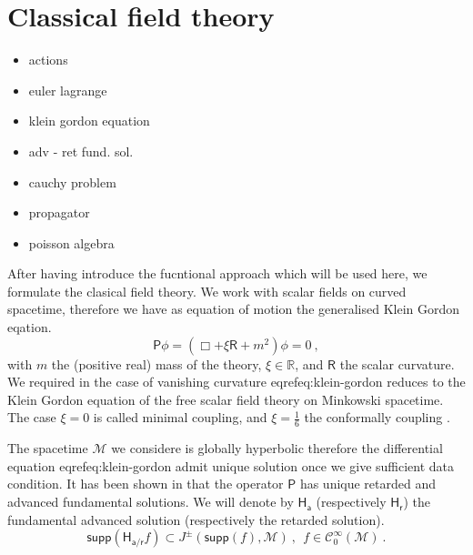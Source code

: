 \documentclass[10pt]{book}
\newcommand{\supp}{\mathsf{supp}}
\newcommand{\Ccal}{\mathcal{C}}
\newcommand{\Mcal}{\mathcal{M}}
\newcommand{\Rbb}{\mathbb{R}}
\newcommand{\Hsf}{\mathsf{H}}
\newcommand{\Psf}{\mathsf{P}}
\newcommand{\Rsf}{\mathsf{R}}
\newcommand{\asf}{\mathsf{a}}
\newcommand{\rsf}{\mathsf{r}}
\theoremstyle{break}
\begin{document}
\section{Classical field theory}

\begin{itemize}
\item actions
\item euler lagrange
\item klein gordon equation
\item adv - ret fund. sol.
\item cauchy problem
\item propagator
\item poisson algebra
\end{itemize}

\vspace*{88pt}


After having introduce the fucntional approach which will be used here, we formulate the clasical field theory. We work with scalar fields on curved spacetime, therefore we have as equation of motion the generalised Klein Gordon eqation.%
%
\begin{equation}
\Psf \phi = \left( \Box + \xi \Rsf + m^2 \right) \phi = 0 \ , 
\end{equation}
%
with $m$ the (positive real) mass of the theory, $\xi \in \Rbb$, and $\Rsf$ the scalar curvature. We required in the case of vanishing curvature eqref{eq:klein-gordon} reduces to the Klein Gordon equation of the free scalar field theory on Minkowski spacetime. The case $\xi=0$ is called minimal coupling, and $\xi=\frac16$ the conformally coupling %
.\par%


\bigskip


The spacetime $\Mcal$ we considere is globally hyperbolic therefore the differential equation eqref{eq:klein-gordon} admit unique solution once we give sufficient data condition. It has been shown in %
that the operator $\Psf$ has unique retarded and advanced fundamental solutions. We will denote by $\Hsf_\asf$ (respectively $\Hsf_\rsf$) the fundamental advanced solution (respectively the retarded solution). 
%
\begin{equation*}
\supp\left( \Hsf_{\asf/\rsf} f \right) \subset J^{\pm}\left(\supp\left(f\right),\Mcal\right) \ , \ \ f \in \Ccal^\infty_0(\Mcal) \ . 
\end{equation*}
%
\end{document}
